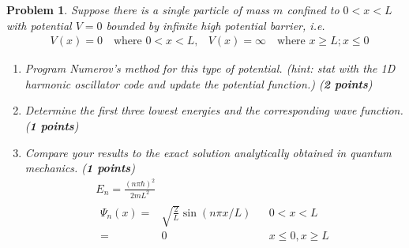 \documentclass[UTF8,10pt,a4paper]{article}
\theoremstyle{Problem}
\newtheorem{prob}{Problem}
\theoremstyle{Solution}
\begin{document}
\thispagestyle{FirstPageStyle}
\begin{prob}
    Suppose there is a single particle of mass $m$ confined to $0<x<L$ with potential $V=0$ bounded by infinite high potential barrier, \textit{i.e.}
    \begin{align*}
         & V(x)=0\quad\text{where }0<x<L,
         & V(x)=\infty\quad\text{where }x\geq L; x\leq 0
    \end{align*}
    \begin{enumerate}
        \item[(a)] Program Numerov's method for this type of potential. (hint: stat with the 1D harmonic oscillator code and update the potential function.) (\textbf{2 points})
        \item[(b)] Determine the first three lowest energies and the corresponding wave function. (\textbf{1 points})
        \item[(c)] Compare your results to the exact solution analytically obtained in quantum mechanics. (\textbf{1 points})
              \begin{gather}
                  E_n=\frac{(n\pi\hbar)^2}{2mL^2}\\
                  \begin{align}
                      \nonumber\Psi_n(x)= & \sqrt{\frac{2}{L}}\sin(n\pi x/L) &  & 0<x<L            \\
                      =                   & 0                                &  & x\leq 0, x\geq L
                  \end{align}
              \end{gather}
    \end{enumerate}
\end{prob}
\end{document}
